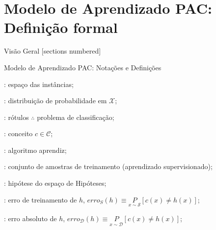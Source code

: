 \documentclass[10pt, professionalfonts]{beamer}
\begin{document}
{
\AtBeginSection{}
\section{Modelo de Aprendizado PAC: Definição formal}
\begin{frame}{Visão Geral}
  [sections numbered]
  \tableofcontents[hideallsubsections]
\end{frame}
\begin{frame}{Modelo de Aprendizado PAC: Notações e Definições}
  \begin{description}\setlength\itemsep{1em}
    \item [$\mathcal{X}$]: espaço das instâncias;
    \item [$\mathcal{D}$]: distribuição de probabilidade em $\mathcal{X}$;
    \item [$\mathcal{Y}=\{0,1\}$]: rótulos $\therefore$ problema de classificação;
    \item [$c:\mathcal{X}\to\mathcal{Y}$]: conceito $c \in \mathcal{C}$;
    \item [$\mathcal{A}$]: algoritmo aprendiz;
    \item [$S=\{(x_i, c(x_i))\}$]: conjunto de amostras de treinamento (aprendizado supervisionado);
    \item [$h \in \mathcal{H}$]: hipótese do espaço de Hipóteses;
    \item [$erro_{S}(h)$]: erro de treinamento de $h$, $erro_{S}(h) \equiv \underset{x \sim \mathcal{S}}{P}[c(x) \neq h(x)]$;
    \item [$erro_{\mathcal{D}}(h)$]: erro absoluto de $h$, $erro_{\mathcal{D}}(h) \equiv \underset{x \sim \mathcal{D}}{P}[c(x) \neq h(x)]$;
    
  \end{description}
\end{frame}

}
\end{document}
